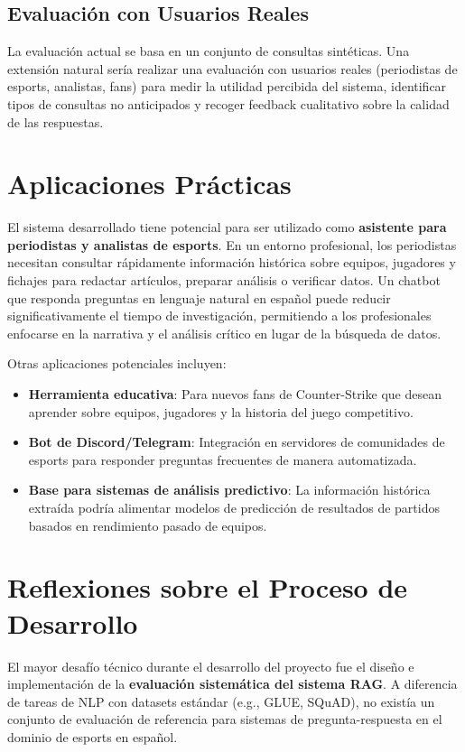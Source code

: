 \subsection{Evaluación con Usuarios Reales}

La evaluación actual se basa en un conjunto de consultas sintéticas. Una extensión natural sería realizar una evaluación con usuarios reales (periodistas de esports, analistas, fans) para medir la utilidad percibida del sistema, identificar tipos de consultas no anticipados y recoger feedback cualitativo sobre la calidad de las respuestas.

\section{Aplicaciones Prácticas}

El sistema desarrollado tiene potencial para ser utilizado como \textbf{asistente para periodistas y analistas de esports}. En un entorno profesional, los periodistas necesitan consultar rápidamente información histórica sobre equipos, jugadores y fichajes para redactar artículos, preparar análisis o verificar datos. Un chatbot que responda preguntas en lenguaje natural en español puede reducir significativamente el tiempo de investigación, permitiendo a los profesionales enfocarse en la narrativa y el análisis crítico en lugar de la búsqueda de datos.

Otras aplicaciones potenciales incluyen:
\begin{itemize}
    \item \textbf{Herramienta educativa}: Para nuevos fans de Counter-Strike que desean aprender sobre equipos, jugadores y la historia del juego competitivo.
    \item \textbf{Bot de Discord/Telegram}: Integración en servidores de comunidades de esports para responder preguntas frecuentes de manera automatizada.
    \item \textbf{Base para sistemas de análisis predictivo}: La información histórica extraída podría alimentar modelos de predicción de resultados de partidos basados en rendimiento pasado de equipos.
\end{itemize}

\section{Reflexiones sobre el Proceso de Desarrollo}

El mayor desafío técnico durante el desarrollo del proyecto fue el diseño e implementación de la \textbf{evaluación sistemática del sistema RAG}. A diferencia de tareas de NLP con datasets estándar (e.g., GLUE, SQuAD), no existía un conjunto de evaluación de referencia para sistemas de pregunta-respuesta en el dominio de esports en español.

